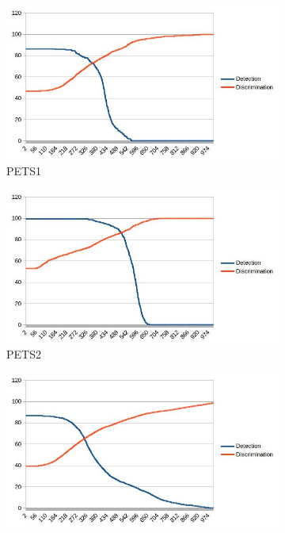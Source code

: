 \documentclass[12pt]{report}
\begin{document}
\begin{figure}
  \begin{subfigure}{.49\linewidth}
 \includegraphics[width=1\linewidth]{figures/pets1_coneR1_response.jpg}
  \caption{PETS1}
\end{subfigure}
\hfill
\begin{subfigure}{.49\linewidth}
 \includegraphics[width=1\linewidth]{figures/pets2_coneR1_response.jpg}
  \caption{PETS2}
\end{subfigure}
\hfill
\begin{subfigure}{.49\linewidth}
 \includegraphics[width=1\linewidth]{figures/highway1_coneR1_response.jpg}

\end{subfigure}
\end{figure}
\end{document}
